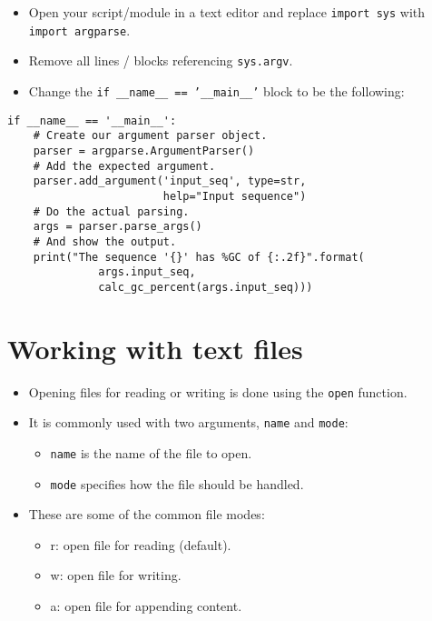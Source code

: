 \documentclass[aspectratio=1610,slidestop]{beamer}
\begin{document}
\begin{pframe}
 \vspace{-0.5cm}
 \begin{itemize}
  \item Open your script/module in a text editor and replace
  \texttt{import sys} with \texttt{import argparse}.
  \item Remove all lines / blocks referencing \texttt{sys.argv}.
  \item Change the \texttt{if __name__ == '__main__'} block to be
  the following:
 \end{itemize}
 \vspace{-0.2cm}
 \begin{pythoncode}
  \begin{verbatim}
if __name__ == '__main__':
    # Create our argument parser object.
    parser = argparse.ArgumentParser()
    # Add the expected argument.
    parser.add_argument('input_seq', type=str,
                        help="Input sequence")
    # Do the actual parsing.
    args = parser.parse_args()
    # And show the output.
    print("The sequence '{}' has %GC of {:.2f}".format(
              args.input_seq,
              calc_gc_percent(args.input_seq)))
   \end{verbatim}
 \end{pythoncode}
\end{pframe}



\section{Working with text files}

\begin{pframe}
 \begin{itemize}
  \item Opening files for reading or writing is done using the
  \texttt{open} function.
  \item It is commonly used with two arguments, \texttt{name} and \texttt{mode}:
  \begin{itemize}
   \item \texttt{name} is the name of the file to open.
   \item \texttt{mode} specifies how the file should be handled.
  \end{itemize}
  \item These are some of the common file modes:
  \begin{itemize}
   \item r: open file for reading (default).
   \item w: open file for writing.
   \item a: open file for appending content.
  \end{itemize}
 \end{itemize}
\end{pframe}
\end{document}
